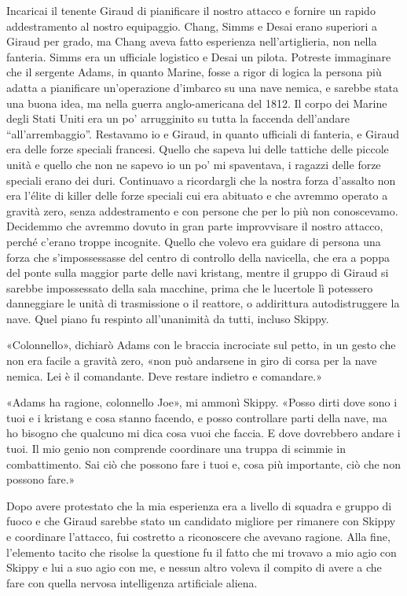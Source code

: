 Incaricai il tenente Giraud di pianificare il nostro attacco e fornire
un rapido addestramento al nostro equipaggio. Chang, Simms e Desai erano
superiori a Giraud per grado, ma Chang aveva fatto esperienza
nell'artiglieria, non nella fanteria. Simms era un ufficiale logistico e
Desai un pilota. Potreste immaginare che il sergente Adams, in quanto
Marine, fosse a rigor di logica la persona più adatta a pianificare
un'operazione d'imbarco su una nave nemica, e sarebbe stata una buona
idea, ma nella guerra anglo-americana del 1812. Il corpo dei Marine
degli Stati Uniti era un po' arrugginito su tutta la faccenda
dell'andare ``all'arrembaggio''. Restavamo io e Giraud, in quanto
ufficiali di fanteria, e Giraud era delle forze speciali francesi.
Quello che sapeva lui delle tattiche delle piccole unità e quello che
non ne sapevo io un po' mi spaventava, i ragazzi delle forze speciali
erano dei duri. Continuavo a ricordargli che la nostra forza d'assalto
non era l'élite di killer delle forze speciali cui era abituato e che
avremmo operato a gravità zero, senza addestramento e con persone che
per lo più non conoscevamo. Decidemmo che avremmo dovuto in gran parte
improvvisare il nostro attacco, perché c'erano troppe incognite. Quello
che volevo era guidare di persona una forza che s'impossessasse del
centro di controllo della navicella, che era a poppa del ponte sulla
maggior parte delle navi kristang, mentre il gruppo di Giraud si sarebbe
impossessato della sala macchine, prima che le lucertole lì potessero
danneggiare le unità di trasmissione o il reattore, o addirittura
autodistruggere la nave. Quel piano fu respinto all'unanimità da tutti,
incluso Skippy.

«Colonnello», dichiarò Adams con le braccia incrociate sul petto, in un
gesto che non era facile a gravità zero, «non può andarsene in giro di
corsa per la nave nemica. Lei è il comandante. Deve restare indietro e
comandare.»

«Adams ha ragione, colonnello Joe», mi ammonì Skippy. «Posso dirti dove
sono i tuoi e i kristang e cosa stanno facendo, e posso controllare
parti della nave, ma ho bisogno che qualcuno mi dica cosa vuoi che
faccia. E dove dovrebbero andare i tuoi. Il mio genio non comprende
coordinare una truppa di scimmie in combattimento. Sai ciò che possono
fare i tuoi e, cosa più importante, ciò che non possono fare.»

Dopo avere protestato che la mia esperienza era a livello di squadra e
gruppo di fuoco e che Giraud sarebbe stato un candidato migliore per
rimanere con Skippy e coordinare l'attacco, fui costretto a riconoscere
che avevano ragione. Alla fine, l'elemento tacito che risolse la
questione fu il fatto che mi trovavo a mio agio con Skippy e lui a suo
agio con me, e nessun altro voleva il compito di avere a che fare con
quella nervosa intelligenza artificiale aliena.

